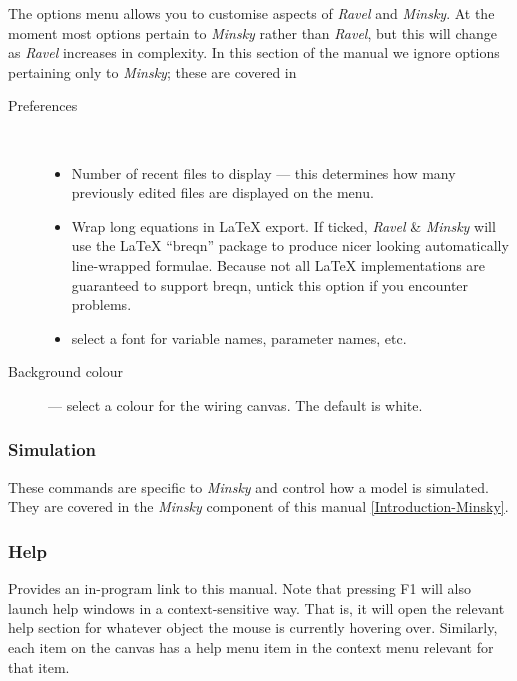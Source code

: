 The options menu allows you to customise aspects of \emph{Ravel} and
\emph{Minsky}. At the moment most options pertain to \emph{Minsky}
rather than \emph{Ravel}, but this will change as \emph{Ravel} increases
in complexity. In this section of the manual we ignore options pertaining
only to \emph{Minsky}; these are covered in 
\begin{description}
\item [{Preferences}] %
\mbox{%
%
}
\begin{itemize}
\item Number of recent files to display --- this determines how many previously
edited files are displayed on the 
menu. 
\item \label{wrap-equations} Wrap long equations in \LaTeX{} export. If ticked,
\emph{Ravel} \& \emph{Minsky} will use the \LaTeX{} ``breqn'' package
to produce nicer looking automatically line-wrapped formulae. Because
not all \LaTeX{} implementations are guaranteed to support breqn, untick
this option if you encounter problems. 
\item \label{font} select a font for variable names, parameter names, etc. 
\end{itemize}
\item [{Background colour}] --- select a colour for the wiring canvas.
The default is white.
\end{description}

\subsubsection{Simulation}

These commands are specific to \emph{Minsky} and control how a model
is simulated. They are covered in the \emph{Minsky} component of this
manual \ref{Introduction-Minsky}. 

\subsubsection{Help}

\label{Help}

Provides an in-program link to this manual. Note that pressing F1
will also launch help windows in a context-sensitive way. That is,
it will open the relevant help section for whatever object the mouse
is currently hovering over. Similarly, each item on the canvas has
a help menu item in the context menu relevant for that item.

